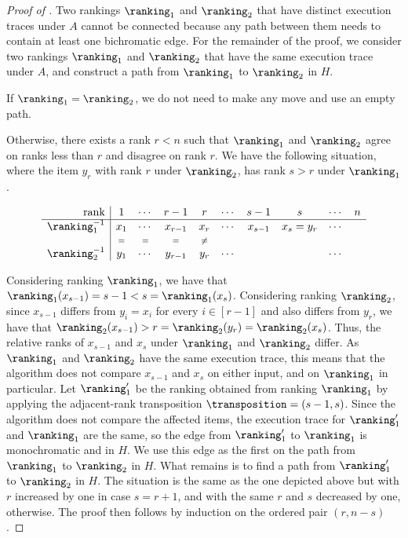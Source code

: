 \begin{proof}[Proof of ]
Two rankings $\ranking_1$ and $\ranking_2$ that have distinct execution traces under $A$ cannot be connected because any path between them needs to contain at least one bichromatic edge. For the remainder of the proof, we consider two rankings $\ranking_1$ and $\ranking_2$ that have the same execution trace under $A$, and construct a path from $\ranking_1$ to $\ranking_2$ in $H$.

If $\ranking_1 = \ranking_2$, we do not need to make any move and use an empty path. 

Otherwise, there exists a rank $r<n$ such that $\ranking_1$ and $\ranking_2$ agree on ranks less than $r$ and disagree on rank $r$. We have the following situation, where the item $y_r$ with rank $r$ under $\ranking_2$, has rank $s>r$ under $\ranking_1$. 

\begin{equation*}
    \begin{array}{r|ccccccccc}
      \text{rank} & 1 & \cdots &  r-1 &   r & \cdots & s-1 & s & \cdots &   n \\
      \hline
      \ranking_1^{-1} & x_1 & \cdots & x_{r-1} &   x_r  & \cdots & x_{s-1} & x_s = y_r & \cdots &     \\
       & {\scriptstyle =}  & {\scriptstyle =}  & {\scriptstyle =}  &  {\scriptstyle \ne}  &    &    &  &   &    \\
      \ranking_2^{-1} & y_1 & \cdots & y_{r-1} & y_r & \cdots &     &     & \cdots &    
    \end{array}
\end{equation*}

Considering ranking $\ranking_1$, we have that $\ranking_1(x_{s-1}) = s-1 < s = \ranking_1(x_s)$. Considering ranking $\ranking_2$, since $x_{s-1}$ differs from $y_i=x_i$ for every $i \in [r-1]$ and also differs from $y_r$, we have that $\ranking_2(x_{s-1}) > r = \ranking_2(y_r) = \ranking_2(x_s)$. Thus, the relative ranks of $x_{s-1}$ and $x_s$ under $\ranking_1$ and $\ranking_2$ differ. As $\ranking_1$ and $\ranking_2$ have the same execution trace, this means that the algorithm does not compare $x_{s-1}$ and $x_s$ on either input, and on $\ranking_1$ in particular. Let $\ranking'_1$ be the ranking obtained from ranking $\ranking_1$ by applying the adjacent-rank transposition $\transposition = (s-1,s)$. Since the algorithm does not compare the affected items, the execution trace for $\ranking'_1$ and $\ranking_1$ are the same, so the edge from $\ranking'_1$ to $\ranking_1$ is monochromatic and in $H$. We use this edge as the first on the path from $\ranking_1$ to $\ranking_2$ in $H$. What remains is to find a path from $\ranking'_1$ to $\ranking_2$ in $H$. The situation is the same as the one depicted above but with $r$ increased by one in case $s=r+1$, and with the same $r$ and $s$ decreased by one, otherwise. The proof then follows by induction on the ordered pair $(r,n-s)$. 
\end{proof}

